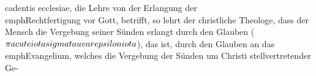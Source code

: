cadentis ecclesiae, die Lehre von der Erlangung der \\emph{Rechtfertigung} vor Gott, betrifft, so lehrt der christliche Theologe, dass der Mensch die Vergebung seiner Sünden erlangt durch den Glauben ($\pi\\acute{\\iota}\\sigma\\tau\\varepsilon\\iota$), das ist, durch den Glauben an das \\emph{Evangelium}, welches die Vergebung der Sünden um Christi stellvertretender Ge-